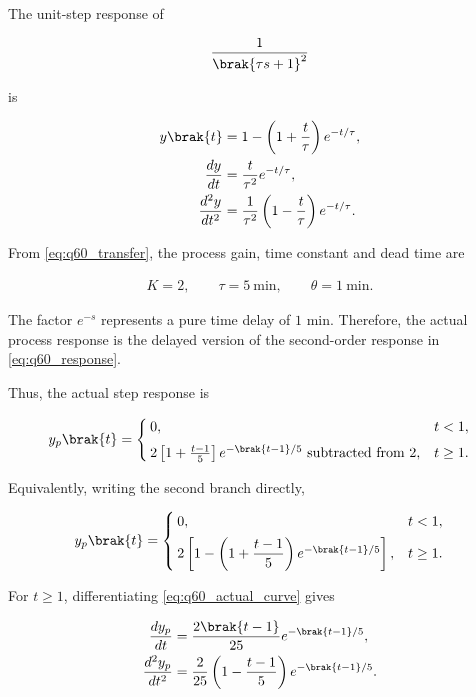\begin{enumerate}[label=\thesubsection.\arabic*, ref=\thesubsection.\theenumi,itemsep=0pt]
The unit-step response of

\begin{align}
\frac{1}{\brak{\tau s+1}^2}
\end{align}

is

\begin{align}
y\brak{t}
&=1-\left(1+\frac{t}{\tau}\right)e^{-t/\tau},
\label{eq:q60_response}
\\
\frac{dy}{dt}
&=\frac{t}{\tau^2}e^{-t/\tau},
\label{eq:q60_first_derivative}
\\
\frac{d^2y}{dt^2}
&=\frac{1}{\tau^2}
\left(1-\frac{t}{\tau}\right)e^{-t/\tau}.
\label{eq:q60_second_derivative}
\end{align}

\solution

From \eqref{eq:q60_transfer}, the process gain, time constant and
dead time are

\begin{align}
K=2,\qquad
\tau=5~\text{min},\qquad
\theta=1~\text{min}.
\label{eq:q60_parameters}
\end{align}

The factor $e^{-s}$ represents a pure time delay of $1$ min.
Therefore, the actual process response is the delayed version of the
second-order response in \eqref{eq:q60_response}.

Thus, the actual step response is

\begin{align}
y_p\brak{t}
=
\begin{cases}
0, & t<1,\\[4pt]
2\left[
1+\frac{t-1}{5}
\right]
e^{-\brak{t-1}/5}
\text{ subtracted from }2,
& t\geq1.
\end{cases}
\end{align}

Equivalently, writing the second branch directly,

\begin{align}
y_p\brak{t}
=
\begin{cases}
0, & t<1,\\[4pt]
2\left[
1-\left(1+\dfrac{t-1}{5}\right)
e^{-\brak{t-1}/5}
\right],
& t\geq1.
\end{cases}
\label{eq:q60_actual_curve}
\end{align}

For $t\geq1$, differentiating \eqref{eq:q60_actual_curve} gives

\begin{align}
\frac{dy_p}{dt}
&=
\frac{2\brak{t-1}}{25}e^{-\brak{t-1}/5},
\label{eq:q60_slope}
\\
\frac{d^2y_p}{dt^2}
&=
\frac{2}{25}
\left(1-\frac{t-1}{5}\right)
e^{-\brak{t-1}/5}.
\label{eq:q60_second_derivative_actual}
\end{align}


\end{enumerate}
